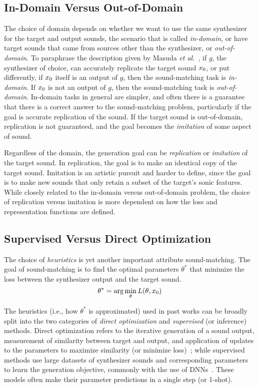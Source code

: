 \subsection{In-Domain Versus Out-of-Domain}
\label{sec:in-domain}
The choice of domain depends on whether we want to use the same synthesizer for the target and output sounds, the scenario that is called \textit{in-domain}, or have target sounds that came from sources other than the synthesizer, or \textit{out-of-domain}. To paraphrase the description given by Masuda \textit{et al.}~\cite{masuda2021soundmatch}, if $g$, the synthesizer of choice, can accurately replicate the target sound $x_{0}$, or put differently, if $x_{0}$ itself is an output of $g$, then the sound-matching task is \textit{in-domain}. If $x_{0}$ is not an output of $g$, then the sound-matching task is \textit{out-of-domain}. In-domain tasks in general are simpler, and often there is a guarantee that there is a correct answer to the sound-matching problem, particularly if the goal is accurate replication of the sound. If the target sound is out-of-domain, replication is not guaranteed, and the goal becomes the \textit{imitation} of some aspect of sound. 

Regardless of the domain, the generation goal can be \textit{replication} or \textit{imitation} of the target sound. In replication, the goal is to make an identical copy of the target sound. Imitation is an artistic pursuit and harder to define, since the goal is to make new sounds that only retain a subset of the target's sonic features. While closely related to the in-domain versus out-of-domain problem, the choice of replication versus imitation is more dependent on how the loss and representation functions are defined. 

\subsection{Supervised Versus Direct Optimization}
\label{sec:optimization}

The choice of \textit{heuristics} is yet another important attribute sound-matching. The goal of sound-matching is to find the optimal parameters $\theta^*$ that minimize the loss between the synthesizer output and the target sound. 
\[
\theta^* = \arg\min_{\theta} L(\theta,x_{0})
\]

The heuristics (i.e., how $\theta^*$ is approximated) used in past works can be broadly split into the two categories of \textit{direct optimization} and \textit{supervised}  (or inference) methods. Direct optimization refers to the iterative generation of a sound output, measurement of similarity between target and output, and application of updates to the parameters to maximize similarity (or minimize loss)~\cite{horner1993machine,mitchell2007evolutionary,yee2018automatic,vahidi2023mesostructures}; while supervised methods use large datasets of synthesizer sounds and corresponding parameters to learn the generation objective, commonly with the use of DNNs~\cite{engel2020ddsp,salimi2020make,yee2018automatic,esling2019flow}. These models often make their parameter predictions in a single step (or 1-shot). 

